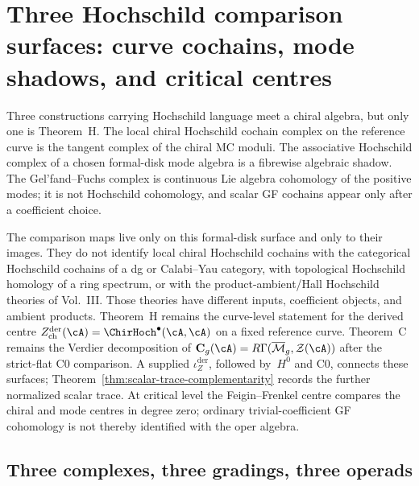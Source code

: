 \chapter{Three Hochschild comparison surfaces: curve cochains, mode
shadows, and critical centres}
\label{chap:three-hochschild-unification}\label{ch:three-hochschild-unification-platonic}


Three constructions carrying Hochschild language meet a chiral algebra,
but only one is Theorem~H. The local chiral Hochschild cochain complex
on the reference curve is the tangent complex of the chiral MC moduli. The
associative Hochschild complex of a chosen formal-disk mode algebra is
a fibrewise algebraic shadow. The Gel'fand--Fuchs complex is continuous
Lie algebra cohomology of the positive modes; it is not Hochschild
cohomology, and scalar GF cochains appear only after a coefficient
choice.

The comparison maps live only on this formal-disk surface and only to
their images. They do not identify local chiral Hochschild cochains with
the categorical Hochschild cochains of a dg or Calabi--Yau category, with
topological Hochschild homology of a ring spectrum, or with the
product-ambient/Hall Hochschild theories of Vol.~III. Those theories
have different inputs, coefficient objects, and ambient products.
Theorem~H remains the curve-level statement for the derived centre
$Z^{\mathrm{der}}_{\mathrm{ch}}(\cA)=\ChirHoch^\bullet(\cA,\cA)$ on a
fixed reference curve.  Theorem~C remains the Verdier decomposition of
$\mathbf C_g(\cA)=R\Gamma(\overline{\mathcal M}_g,\mathcal Z(\cA))$
after the strict-flat C0 comparison.  A supplied
$\iota_Z^{\mathrm{der}}$, followed by~$H^0$ and C0, connects these
surfaces; Theorem~\ref{thm:scalar-trace-complementarity} records the
further normalized scalar trace.
At critical level the Feigin--Frenkel centre compares the chiral and
mode centres in degree zero; ordinary trivial-coefficient GF
cohomology is not thereby identified with the oper algebra.

\section{Three complexes, three gradings, three operads}
\label{sec:three-three-three}

